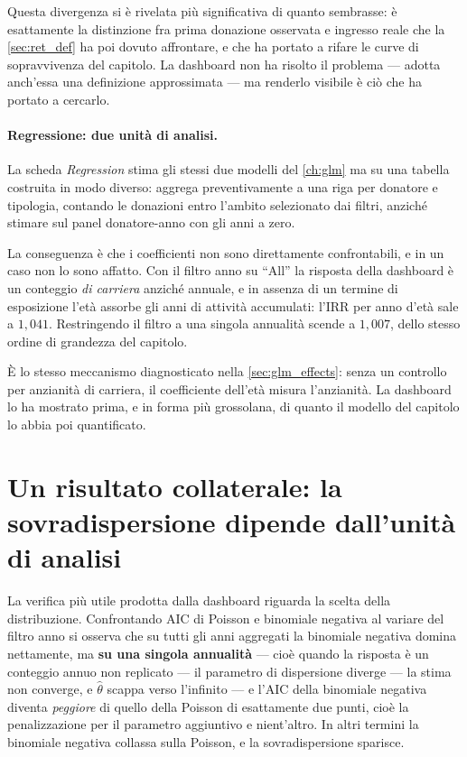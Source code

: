 Questa divergenza si è rivelata più significativa di quanto sembrasse: è
esattamente la distinzione fra prima donazione osservata e ingresso reale che
la \cref{sec:ret_def} ha poi dovuto affrontare, e che ha portato a rifare le
curve di sopravvivenza del capitolo. La dashboard non ha risolto il problema
--- adotta anch'essa una definizione approssimata --- ma renderlo visibile è
ciò che ha portato a cercarlo.

\paragraph{Regressione: due unità di analisi.}
La scheda \emph{Regression} stima gli stessi due modelli del \cref{ch:glm} ma
su una tabella costruita in modo diverso: aggrega preventivamente a una riga
per donatore e tipologia, contando le donazioni entro l'ambito selezionato dai
filtri, anziché stimare sul panel donatore-anno con gli anni a zero.

La conseguenza è che i coefficienti non sono direttamente confrontabili, e in un
caso non lo sono affatto. Con il filtro anno su ``All'' la risposta della
dashboard è un conteggio \emph{di carriera} anziché annuale, e in assenza di un
termine di esposizione l'età assorbe gli anni di attività accumulati: l'IRR per
anno d'età sale a $1{,}041$. Restringendo il filtro a una singola annualità
scende a $1{,}007$, dello stesso ordine di grandezza del capitolo.

È lo stesso meccanismo diagnosticato nella \cref{sec:glm_effects}: senza un
controllo per anzianità di carriera, il coefficiente dell'età misura
l'anzianità. La dashboard lo ha mostrato prima, e in forma più grossolana, di
quanto il modello del capitolo lo abbia poi quantificato.

\section{Un risultato collaterale: la sovradispersione dipende dall'unità di analisi}
\label{sec:dash_overdisp}

La verifica più utile prodotta dalla dashboard riguarda la scelta della
distribuzione. Confrontando AIC di Poisson e binomiale negativa al variare del
filtro anno si osserva che su tutti gli anni aggregati la binomiale negativa
domina nettamente, ma \textbf{su una singola annualità} --- cioè quando la
risposta è un conteggio annuo non replicato --- il parametro di dispersione
diverge --- la stima non converge, e $\hat{\theta}$ scappa verso l'infinito ---
e l'AIC della binomiale negativa diventa \emph{peggiore} di quello della
Poisson di esattamente due punti, cioè la penalizzazione per il parametro
aggiuntivo e nient'altro. In altri termini la
binomiale negativa collassa sulla Poisson, e la sovradispersione sparisce.

